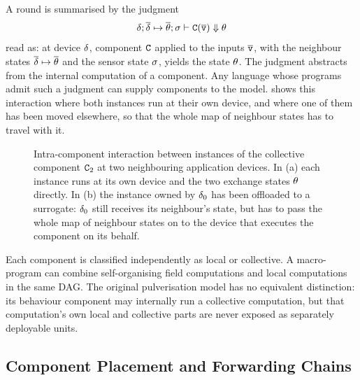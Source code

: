 A round is summarised by the judgment
\[
    \delta;\overline{\delta}\mapsto \overline{\theta};\sigma\vdash \mathtt{C}(\overline{\mathtt{v}})\Downarrow \theta
\]
read as: at device $\delta$, component $\mathtt{C}$ applied to the inputs $\overline{\mathtt{v}}$,
with the neighbour states $\overline{\delta}\mapsto \overline{\theta}$ and the sensor state $\sigma$,
yields the state $\theta$.
%
The judgment abstracts from the internal computation of a component.
Any language whose programs admit such a judgment can supply components to the model.
%
 shows this interaction where both instances run at their own device,
and where one of them has been moved elsewhere,
so that the whole map of neighbour states has to travel with it.

\begin{figure}[t]
    \centering
    
    \caption[Intra-component interaction, before and after offloading]{Intra-component interaction between instances of the collective component $\mathtt{C}_2$ at two neighbouring application devices. In (a) each instance runs at its own device and the two exchange states $\theta$ directly. In (b) the instance owned by $\delta_0$ has been offloaded to a surrogate: $\delta_0$ still receives its neighbour's state, but has to pass the whole map of neighbour states on to the device that executes the component on its behalf.}
    \label{fig:intra-component-interaction}
\end{figure}

Each component is classified independently as local or collective.
A macro-program can combine self-organising field computations and local computations in the same \ac{DAG}.
%
The original pulverisation model has no equivalent distinction:
its behaviour component may internally run a collective computation,
but that computation's own local and collective parts are never exposed as separately deployable units.

\subsection{Component Placement and Forwarding Chains}
\label{subsec:forwarding-chains}

